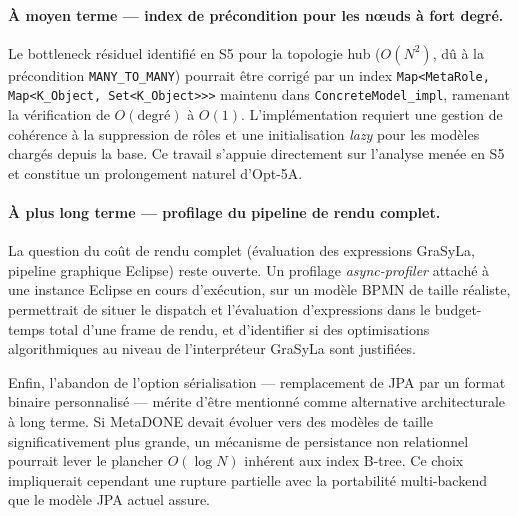 \paragraph{À moyen terme — index de précondition pour les n\oe{}uds à fort degré.}
Le bottleneck résiduel identifié en S5 pour la topologie hub ($O(N^2)$, dû à la précondition \texttt{MANY\_TO\_MANY}) pourrait être corrigé par un index \texttt{Map<MetaRole, Map<K\_Object, Set<K\_Object>>>} maintenu dans \texttt{ConcreteModel\_impl}, ramenant la vérification de $O(\text{degré})$ à $O(1)$. L'implémentation requiert une gestion de cohérence à la suppression de rôles et une initialisation \emph{lazy} pour les modèles chargés depuis la base. Ce travail s'appuie directement sur l'analyse menée en S5 et constitue un prolongement naturel d'Opt-5A.

\paragraph{À plus long terme — profilage du pipeline de rendu complet.}
La question du coût de rendu complet (évaluation des expressions GraSyLa, pipeline graphique Eclipse) reste ouverte. Un profilage \emph{async-profiler} attaché à une instance Eclipse en cours d'exécution, sur un modèle BPMN de taille réaliste, permettrait de situer le dispatch et l'évaluation d'expressions dans le budget-temps total d'une frame de rendu, et d'identifier si des optimisations algorithmiques au niveau de l'interpréteur GraSyLa sont justifiées.

Enfin, l'abandon de l'option sérialisation — remplacement de JPA par un format binaire personnalisé — mérite d'être mentionné comme alternative architecturale à long terme. Si MetaDONE devait évoluer vers des modèles de taille significativement plus grande, un mécanisme de persistance non relationnel pourrait lever le plancher $O(\log N)$ inhérent aux index B-tree. Ce choix impliquerait cependant une rupture partielle avec la portabilité multi-backend que le modèle JPA actuel assure.
